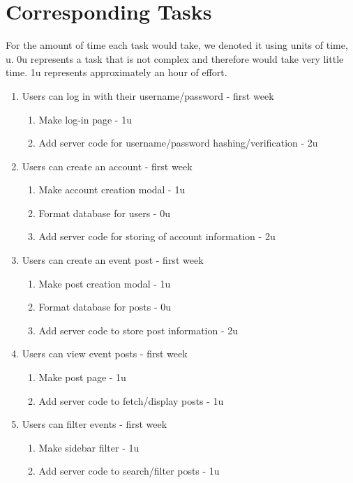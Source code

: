 \documentclass[a4paper]{article}
\begin{document}
\section{Corresponding Tasks}
For the amount of time each task would take, we denoted it using units of time, u. 0u represents a task that is not complex and therefore would take very little time. 1u represents approximately an hour of effort.
\begin{enumerate}

\item Users can log in with their username/password - first week
\begin{enumerate}
\item Make log-in page - 1u
\item Add server code for username/password hashing/verification - 2u
\end{enumerate}

\item Users can create an account - first week
\begin{enumerate}
\item Make account creation modal - 1u
\item Format database for users - 0u
\item Add server code for storing of account information - 2u
\end{enumerate}

\item Users can create an event post - first week
\begin{enumerate}
\item Make post creation modal - 1u
\item Format database for posts - 0u
\item Add server code to store post information - 2u
\end{enumerate}

\item Users can view event posts - first week
\begin{enumerate}
\item Make post page  - 1u
\item Add server code to fetch/display posts - 1u
\end{enumerate}

\item Users can filter events - first week
\begin{enumerate}
\item Make sidebar filter - 1u
\item Add server code to search/filter posts - 1u
\end{enumerate}


\end{enumerate}
\end{document}
